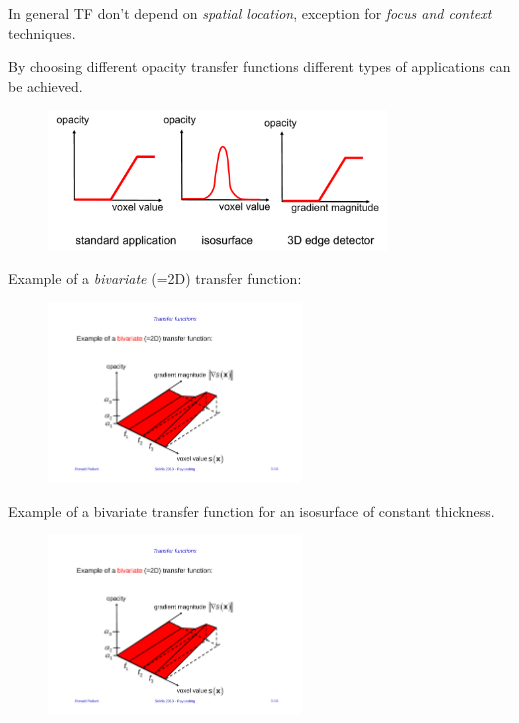 In general TF don't depend on \emph{spatial location}, exception for \emph{focus and context} techniques.

By choosing different opacity transfer functions different types of applications can be achieved.
\begin{figure}[H]
\centering
\includegraphics[width=0.8\textwidth]{img/03_tf_types}
\end{figure}

Example of a \emph{bivariate} (=2D) transfer function:
\begin{figure}[H]
    \centering
    \includegraphics[width=0.6\textwidth,page=1]{img/03_tf_bivariate}
\end{figure}
Example of a bivariate transfer function for an isosurface of constant thickness.
\begin{figure}[H]
    \centering
    \includegraphics[width=0.6\textwidth,page=2]{img/03_tf_bivariate}
\end{figure}

